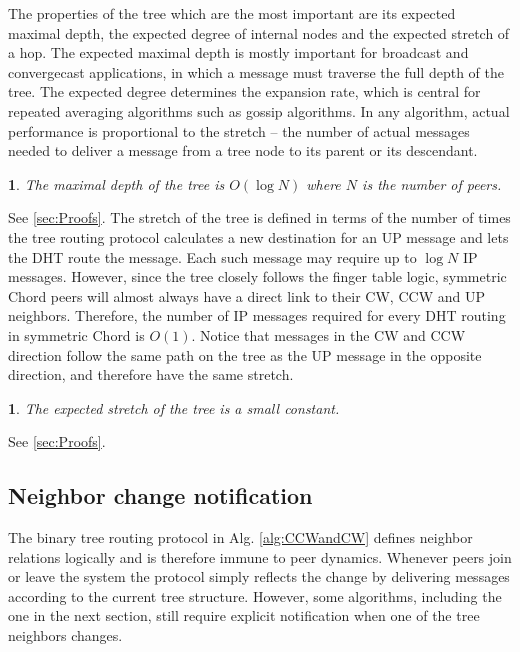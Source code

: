 \documentclass[12pt,english,journal]{elsarticle}
\makeatletter
\numberwithin{equation}{section}
\numberwithin{figure}{section}
\theoremstyle{plain}
\theoremstyle{plain}
\newtheorem{lem}[thm]{\protect\lemmaname}
\newenvironment{proof}[1][\protect\proofname]{\par
\normalfont\topsep6\p@\@plus6\p@\relax
\trivlist
\itemindent\parindent
\item[\hskip\labelsep
\scshape
#1]\ignorespaces
}{\endtrivlist\@endpefalse
}
\providecommand{\proofname}{Proof}
\providecommand{\lemmaname}{Lemma}
\makeatother
\begin{document}
The properties of the tree which are the most important are its expected
maximal depth, the expected degree of internal nodes and the expected
stretch of a hop. The expected maximal depth is mostly important for
broadcast and convergecast applications, in which a message must traverse
the full depth of the tree. The expected degree determines the expansion
rate, which is central for repeated averaging algorithms such as gossip
algorithms. In any algorithm, actual performance is proportional to
the stretch -- the number of actual messages needed to deliver a message
from a tree node to its parent or its descendant.
\begin{lem}
The maximal depth of the tree is $O\left(\log N\right)$ where $N$
is the number of peers.\end{lem}
\begin{proof}
See \ref{sec:Proofs}.
\end{proof}
The stretch of the tree is defined in terms of the number of times
the tree routing protocol calculates a new destination for an UP message
and lets the DHT route the message. Each such message may require
up to $\log N$ IP messages. However, since the tree closely follows
the finger table logic, symmetric Chord peers will almost always have
a direct link to their CW, CCW and UP neighbors. Therefore, the number
of IP messages required for every DHT routing in symmetric Chord is
$O\left(1\right)$. Notice that messages in the CW and CCW direction
follow the same path on the tree as the UP message in the opposite
direction, and therefore have the same stretch. 
\begin{lem}
The expected stretch of the tree is a small constant.\end{lem}
\begin{proof}
See \ref{sec:Proofs}.
\end{proof}

\subsection{\label{sub:Detecting-neighbor-dynamics}Neighbor change notification}

The binary tree routing protocol in Alg. \ref{alg:CCWandCW} defines
neighbor relations logically and is therefore immune to peer dynamics.
Whenever peers join or leave the system the protocol simply reflects
the change by delivering messages according to the current tree structure.
However, some algorithms, including the one in the next section, still
require explicit notification when one of the tree neighbors changes.
\end{document}
